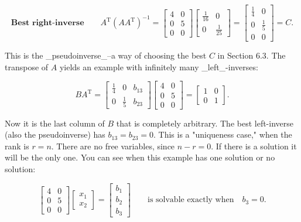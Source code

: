 \[\mathbf{Best\text{ right-inverse}}\qquad A^{\mathrm{T}}(AA^{\mathrm{T}})^{-1}= \begin{bmatrix}4&0\\ 0&5\\ 0&0\end{bmatrix}\begin{bmatrix}\frac{1}{16}&0\\ 0&\frac{1}{25}\end{bmatrix}=\begin{bmatrix}\frac{1}{4}&0\\ 0&\frac{1}{5}\\ 0&0\end{bmatrix}=C.\]

This is the _pseudoinverse_--a way of choosing the best \(C\) in Section 6.3. The transpose of \(A\) yields an example with infinitely many _left_-inverses:

\[BA^{\mathrm{T}}=\begin{bmatrix}\frac{1}{4}&0&b_{13}\\ 0&\frac{1}{5}&b_{23}\end{bmatrix}\begin{bmatrix}4&0\\ 0&5\\ 0&0\end{bmatrix}=\begin{bmatrix}1&0\\ 0&1\end{bmatrix}.\]

Now it is the last column of \(B\) that is completely arbitrary. The best left-inverse (also the pseudoinverse) has \(b_{13}=b_{23}=0\). This is a "uniqueness case," when the rank is \(r=n\). There are no free variables, since \(n-r=0\). If there is a solution it will be the only one. You can see when this example has one solution or no solution:

\[\begin{bmatrix}4&0\\ 0&5\\ 0&0\end{bmatrix}\begin{bmatrix}x_{1}\\ x_{2}\end{bmatrix}=\begin{bmatrix}b_{1}\\ b_{2}\\ b_{3}\end{bmatrix}\qquad\text{is solvable exactly when}\quad b_{3}=0.\] 